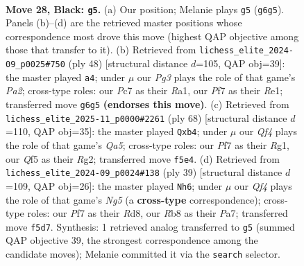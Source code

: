 \documentclass[11pt]{article}
\begin{document}
\clearpage

\begin{figure}[p]\centering
\begin{subfigure}{0.46\textwidth}\centering
\resizebox{\linewidth}{!}{%
\newchessgame
\chessboard[
  setfen={1r1rn1k1/p1p2p2/6p1/2Pp1q1p/5P2/1P2P1P1/1Q1BR2P/4KBR1 b - - 3 28},
  showmover=false,
  pgfstyle=straightmove, color=movearrow, markmove={g6-g5}
]}
\caption{}
\end{subfigure}\hfill
\begin{subfigure}{0.46\textwidth}\centering
\resizebox{\linewidth}{!}{%
\newchessgame
\chessboard[
  setfen={1kb1r2r/n6p/1p1q4/3p1p1P/3Pp1p1/1NP5/P3QPP1/R3RNK1 w - - 0 25},
  showmover=false,
  pgfstyle=straightmove, color=movearrow, markmove={a2-a4}
]}
\caption{}
\end{subfigure}
\\[4pt]
\begin{subfigure}{0.46\textwidth}\centering
\resizebox{\linewidth}{!}{%
\newchessgame
\chessboard[
  setfen={2r4k/5pb1/2rp3p/Q2Np1pq/Pp2P3/1P2P3/KP4R1/6R1 w - - 0 35},
  showmover=false,
  pgfstyle=straightmove, color=movearrow, markmove={a5-b4}
]}
\caption{}
\end{subfigure}\hfill
\begin{subfigure}{0.46\textwidth}\centering
\resizebox{\linewidth}{!}{%
\newchessgame
\chessboard[
  setfen={3r2k1/pp1rqpp1/2p1p1p1/8/2PP2n1/3R2B1/PPQ2PPP/3R2K1 b - - 11 20},
  showmover=false,
  pgfstyle=straightmove, color=movearrow, markmove={g4-h6}
]}
\caption{}
\end{subfigure}
\caption{\textbf{Move 28, Black: \texttt{g5}.} (a) Our position; Melanie plays \texttt{g5} (\texttt{g6g5}). Panels (b)--(d) are the retrieved master positions whose correspondence most drove this move (highest QAP objective among those that transfer to it). (b) Retrieved from \texttt{lichess\_elite\_2024-09\_p0025\#750} (ply 48) [structural distance $d$=105, QAP obj=39]: the master played \texttt{a4}; under $\mu$ our \emph{Pg3} plays the role of that game's \emph{Pa2}; cross-type roles: our \emph{P}c7 as their \emph{R}a1, our \emph{P}f7 as their \emph{R}e1; transferred move \texttt{g6g5} \textbf{(endorses this move)}. (c) Retrieved from \texttt{lichess\_elite\_2025-11\_p0000\#2261} (ply 68) [structural distance $d$=110, QAP obj=35]: the master played \texttt{Qxb4}; under $\mu$ our \emph{Qf4} plays the role of that game's \emph{Qa5}; cross-type roles: our \emph{P}f7 as their \emph{R}g1, our \emph{Q}f5 as their \emph{R}g2; transferred move \texttt{f5e4}. (d) Retrieved from \texttt{lichess\_elite\_2024-09\_p0024\#138} (ply 39) [structural distance $d$=109, QAP obj=26]: the master played \texttt{Nh6}; under $\mu$ our \emph{Qf4} plays the role of that game's \emph{Ng5} (a \textbf{cross-type} correspondence); cross-type roles: our \emph{P}f7 as their \emph{R}d8, our \emph{R}b8 as their \emph{P}a7; transferred move \texttt{f5d7}. Synthesis: 1 retrieved analog transferred to \texttt{g5} (summed QAP objective 39, the strongest correspondence among the candidate moves); Melanie committed it via the \texttt{search} selector.}
\label{fig:thought-m55}
\end{figure}
\end{document}
